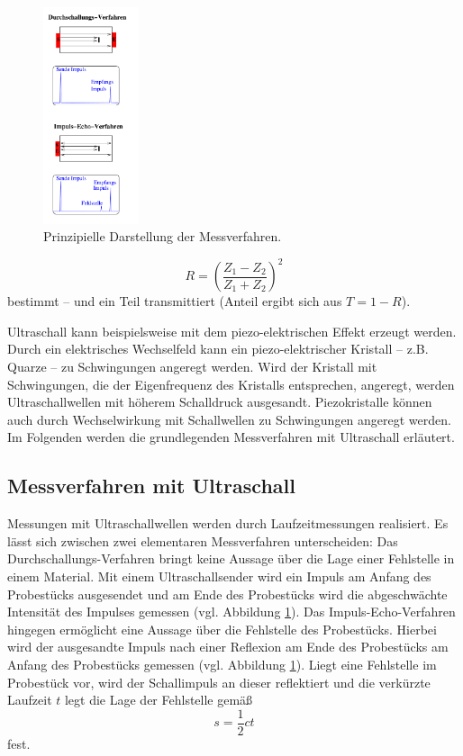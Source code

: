 \begin{figure}
	\centering
	\includegraphics[width=0.25\textwidth]{Bilder/Messverfahren.png}
	\caption{Prinzipielle Darstellung der Messverfahren. \cite{Anleitung}}
	\label{fig:echo}
\end{figure}
\begin{equation}
	R =(\frac{Z_1-Z_2}{Z_1+Z_2})^2
\end{equation}
bestimmt -- und ein Teil transmittiert (Anteil ergibt sich aus $T=1-R$).

Ultraschall kann beispielsweise mit dem piezo-elektrischen Effekt erzeugt werden.
Durch ein elektrisches Wechselfeld kann ein piezo-elektrischer Kristall -- z.B. Quarze -- zu
Schwingungen angeregt werden. Wird der Kristall mit
Schwingungen, die der Eigenfrequenz des Kristalls entsprechen, angeregt, werden
Ultraschallwellen mit höherem Schalldruck ausgesandt. Piezokristalle können auch durch
Wechselwirkung mit Schallwellen zu Schwingungen angeregt werden.
Im Folgenden werden die grundlegenden Messverfahren mit Ultraschall erläutert.
\subsection{Messverfahren mit Ultraschall}
Messungen mit Ultraschallwellen werden durch Laufzeitmessungen realisiert.
Es lässt sich zwischen zwei elementaren Messverfahren unterscheiden:
Das Durchschallungs-Verfahren bringt keine Aussage über die Lage einer Fehlstelle in einem
Material. Mit einem Ultraschallsender wird ein Impuls am Anfang des Probestücks ausgesendet
und am Ende des Probestücks wird die abgeschwächte Intensität des Impulses gemessen (vgl.
Abbildung \ref{fig:echo}).
Das Impuls-Echo-Verfahren hingegen ermöglicht eine Aussage über die Fehlstelle des Probestücks.
Hierbei wird der ausgesandte Impuls nach einer Reflexion am Ende des Probestücks am Anfang des
Probestücks gemessen (vgl. Abbildung \ref{fig:echo}).
Liegt eine Fehlstelle im Probestück vor, wird der Schallimpuls an dieser reflektiert und die
verkürzte Laufzeit $t$ legt die Lage der Fehlstelle gemäß
\begin{equation}
	\label{eqn:laufzeit}
	s = \frac{1}{2} c t
\end{equation}
fest.
\FloatBarrier
